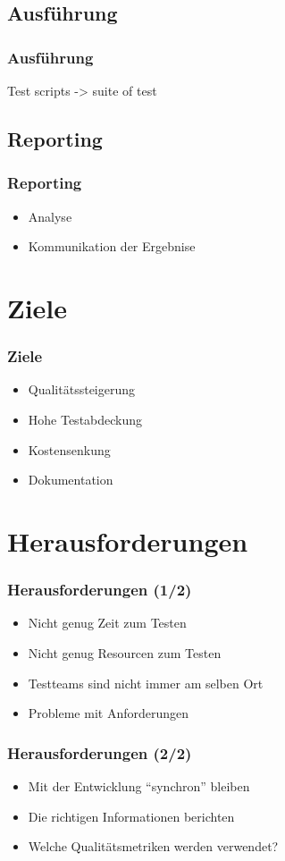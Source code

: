 \subsection{Ausf\"uhrung}
\begin{frame}
	\frametitle{Ausf\"uhrung}
	Test scripts -> suite of test
\end{frame}

\subsection{Reporting}
\begin{frame}
	\frametitle{Reporting}
	\begin{itemize}
		\item Analyse
		\item Kommunikation der Ergebnise
	\end{itemize}
\end{frame}

\section{Ziele}
\begin{frame}
	\frametitle{Ziele}
	\begin{itemize}
		\item Qualit\"atssteigerung
		\item Hohe Testabdeckung
		\item Kostensenkung
		\item Dokumentation
	\end{itemize}
\end{frame}

\section{Herausforderungen}
\begin{frame}
	\frametitle{Herausforderungen (1/2)}
	\begin{itemize}
		\item Nicht genug Zeit zum Testen
		\item Nicht genug Resourcen zum Testen
		\item Testteams sind nicht immer am selben Ort
		\item Probleme mit Anforderungen
	\end{itemize}
\end{frame}

\begin{frame}
	\frametitle{Herausforderungen (2/2)}
	\begin{itemize}
		\item Mit der Entwicklung "`synchron"' bleiben
		\item Die richtigen Informationen berichten
		\item Welche Qualit\"atsmetriken werden verwendet?
	\end{itemize}
\end{frame}

